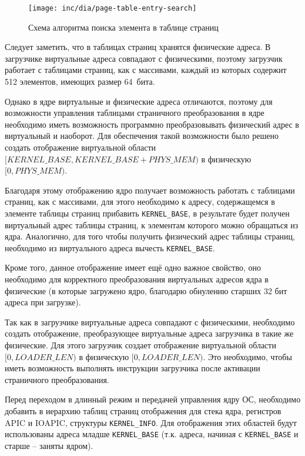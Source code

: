 \begin{figure}[ht!]
  \centering
  \texttt{[image: inc/dia/page-table-entry-search]}
  \caption{Схема алгоритма поиска элемента в таблице страниц}
  \label{fig:page-table-entry-search}
\end{figure}

Следует заметить, что в таблицах страниц хранятся физические адреса. В загрузчике виртуальные
адреса совпадают с физическими, поэтому загрузчик работает с таблицами страниц, как с массивами,
каждый из которых содержит 512 элементов, имеющих размер 64~бита.

Однако в ядре виртуальные и физические адреса отличаются, поэтому для возможности управления
таблицами страничного преобразования в ядре необходимо иметь возможность программно преобразовывать
физический адрес в виртуальный и наоборот. Для обеспечения такой возможности было решено
создать отображение виртуальной области $[KERNEL\_BASE, KERNEL\_BASE + PHYS\_MEM)$ в физическую $[0, PHYS\_MEM)$.

Благодаря этому отображению ядро получает возможность работать с таблицами страниц, как с массивами,
для этого необходимо к адресу, содержащемся в элементе таблицы страниц прибавить \texttt{KERNEL\_BASE},
в результате будет получен виртуальный адрес таблицы страниц, к элементам которого можно обращаться из
ядра. Аналогично, для того чтобы получить физический адрес таблицы страниц, необходимо из виртуального
адреса вычесть \texttt{KERNEL\_BASE}.

Кроме того, данное отображение имеет ещё одно важное свойство, оно необходимо для корректного
преобразования виртуальных адресов ядра в физические (в которые загружено ядро, благодарю обнулению
старших 32 бит адреса при загрузке).

Так как в загрузчике виртуальные адреса совпадают с физическими, необходимо создать отображение,
преобразующее виртуальные адреса загрузчика в такие же физические. Для этого загрузчик создает
отображение виртуальной области $[0, LOADER\_LEN)$ в физическую $[0, LOADER\_LEN)$. Это необходимо,
чтобы иметь возможность выполнять инструкции загрузчика после активации страничного преобразования.

Перед переходом в длинный режим и передачей управления ядру ОС, необходимо добавить в иерархию таблиц
страниц отображения для стека ядра, регистров APIC и IOAPIC, структуры \texttt{KERNEL\_INFO}.
Для отображения этих областей будут использованы адреса младше \texttt{KERNEL\_BASE} (т.к. адреса,
начиная с \texttt{KERNEL\_BASE} и старше -- заняты ядром).


